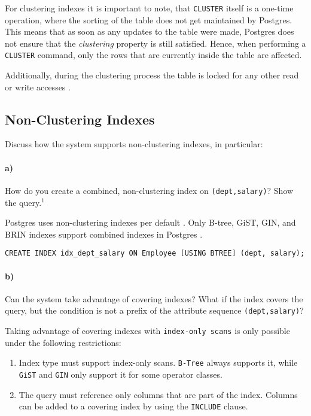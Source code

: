\documentclass[11pt]{scrartcl}
\begin{document}
For clustering indexes it is important to note, that \texttt{CLUSTER} itself is a one-time operation, where the
sorting of the table does not get maintained by Postgres.
This means that as soon as any updates to the table were made, Postgres does not ensure that the \textit{clustering}
property is still satisfied.
Hence, when performing a \texttt{CLUSTER} command, only the rows that are currently inside the table are affected.

Additionally, during the clustering process the table is locked for any other read or write accesses \cite{PostgreSQL2024Cluster}.

\subsection{Non-Clustering Indexes}

Discuss how the system supports non-clustering indexes, in particular:

\paragraph{a)}

How do you create a combined, non-clustering index on \texttt{(dept,salary)}? Show the query.$^1$

Postgres uses non-clustering indexes per default \cite{SO_PostgresClusterVsNonCluster}.
Only B-tree, GiST, GIN, and BRIN indexes support combined indexes in Postgres \cite{PostgreSQL2024MultiColumnIndex}.

\begin{lstlisting}[style=dbtsql]
CREATE INDEX idx_dept_salary ON Employee [USING BTREE] (dept, salary);
\end{lstlisting}

\paragraph{b)}

Can the system take advantage of covering indexes? What if the index covers the query, but the condition is not a prefix of the attribute sequence \texttt{(dept,salary)}?

Taking advantage of covering indexes with \texttt{index-only scans} is only possible under the following restrictions:

\begin{enumerate}
    \item Index type must support index-only scans. \texttt{B-Tree} always supports it, while \texttt{GiST} and
    \texttt{GIN} only support it for some operator classes.
    \item The query must reference only columns that are part of the index.
    Columns can be added to a covering index by using the \texttt{INCLUDE} clause.
\end{enumerate}
\end{document}
